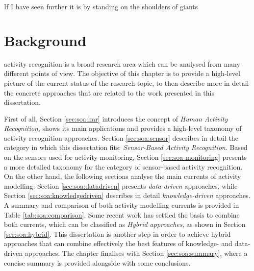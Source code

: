 

\begin{savequote}[50mm]
If I have seen further it is by standing on the shoulders of giants
\end{savequote}

\chapter{Background}
\label{cha:soa}

\ifpdf
    \graphicspath{{2_state_of_the_art/figures/PDF/}{2_state_of_the_art/figures/PNG/}{2_state_of_the_art/figures/}}
\else
    \graphicspath{{2_state_of_the_art/figures/EPS/}{2_state_of_the_art/figures/}}
\fi


 activity recognition is a broad research area which can be analysed from many different points of view. The objective of this chapter is to provide a high-level picture of the current status of the research topic, to then describe more in detail the concrete approaches that are related to the work presented in this dissertation. 

First of all, Section \ref{sec:soa:har} introduces the concept of \textit{Human Activity Recognition}, shows its main applications and provides a high-level taxonomy of activity recognition approaches. Section \ref{sec:soa:sensor} describes in detail the category in which this dissertation fits: \textit{Sensor-Based Activity Recognition}. Based on the sensors used for activity monitoring, Section \ref{sec:soa-monitoring} presents a more detailed taxonomy for the category of sensor-based activity recognition. On the other hand, the following sections analyse the main currents of activity modelling: Section \ref{sec:soa:datadriven} presents \textit{data-driven} approaches, while Section \ref{sec:soa:knowledgedriven} describes in detail \textit{knowledge-driven} approaches. A summary and comparison of both activity modelling currents is provided in Table \ref{tab:soa:comparison}. Some recent work has settled the basis to combine both currents, which can be classified as \textit{Hybrid approaches}, as shown in Section \ref{sec:soa:hybrid}. This dissertation is another step in order to achieve hybrid approaches that can combine effectively the best features of knowledge- and data-driven approaches. The chapter finalises with Section \ref{sec:soa:summary}, where a concise summary is provided alongside with some conclusions.